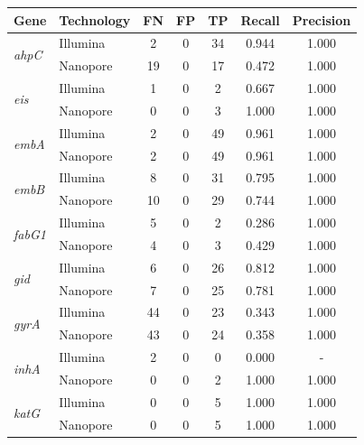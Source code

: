 \begin{table}
\centering
\begin{tabular}{|l|l|c|c|c|c|c|}
\hline
Gene                            & Technology & FN & FP & TP  & Recall & Precision \\ \hline
\multirow{2}{*}{\textit{ahpC}}  & Illumina   & 2  & 0  & 34  & 0.944  & 1.000     \\ \cline{2-7} 
                                & Nanopore   & 19 & 0  & 17  & 0.472  & 1.000     \\ \hline
\multirow{2}{*}{\textit{eis}}   & Illumina   & 1  & 0  & 2   & 0.667  & 1.000     \\ \cline{2-7} 
                                & Nanopore   & 0  & 0  & 3   & 1.000  & 1.000     \\ \hline
\multirow{2}{*}{\textit{embA}}  & Illumina   & 2  & 0  & 49  & 0.961  & 1.000     \\ \cline{2-7} 
                                & Nanopore   & 2  & 0  & 49  & 0.961  & 1.000     \\ \hline
\multirow{2}{*}{\textit{embB}}  & Illumina   & 8  & 0  & 31  & 0.795  & 1.000     \\ \cline{2-7} 
                                & Nanopore   & 10 & 0  & 29  & 0.744  & 1.000     \\ \hline
\multirow{2}{*}{\textit{fabG1}} & Illumina   & 5  & 0  & 2   & 0.286  & 1.000     \\ \cline{2-7} 
                                & Nanopore   & 4  & 0  & 3   & 0.429  & 1.000     \\ \hline
\multirow{2}{*}{\textit{gid}}   & Illumina   & 6  & 0  & 26  & 0.812  & 1.000     \\ \cline{2-7} 
                                & Nanopore   & 7  & 0  & 25  & 0.781  & 1.000     \\ \hline
\multirow{2}{*}{\textit{gyrA}}  & Illumina   & 44 & 0  & 23  & 0.343  & 1.000     \\ \cline{2-7} 
                                & Nanopore   & 43 & 0  & 24  & 0.358  & 1.000     \\ \hline
\multirow{2}{*}{\textit{inhA}}  & Illumina   & 2  & 0  & 0   & 0.000  & -         \\ \cline{2-7} 
                                & Nanopore   & 0  & 0  & 2   & 1.000  & 1.000     \\ \hline
\multirow{2}{*}{\textit{katG}}  & Illumina   & 0  & 0  & 5   & 1.000  & 1.000     \\ \cline{2-7} 
                                & Nanopore   & 0  & 0  & 5   & 1.000  & 1.000     \\ \hline

\end{tabular}
\end{table}
